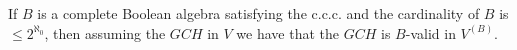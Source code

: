 If $B$ is a complete Boolean algebra satisfying the c.c.c. and the cardinality of $B$ is $\leq 2^{\aleph_0}$, then assuming the $GCH$ in $V$ we have that the $GCH$ is $B$-valid in $V^{(B)}$.
